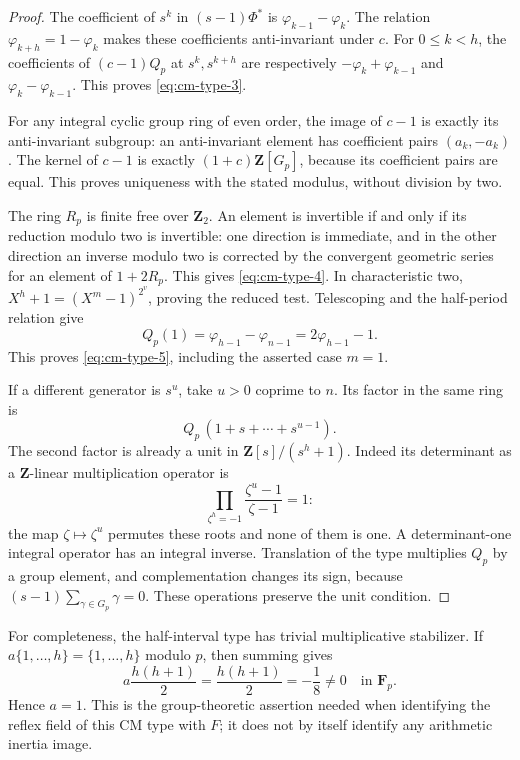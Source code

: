 \begin{proof}
The coefficient of \(s^k\) in \((s-1)\Phi^*\) is
\(\varphi_{k-1}-\varphi_k\). The relation
\(\varphi_{k+h}=1-\varphi_k\) makes these coefficients
anti-invariant under \(c\). For \(0\leq k<h\), the coefficients
of \((c-1)Q_p\) at \(s^k,s^{k+h}\) are respectively
\(-\varphi_k+\varphi_{k-1}\) and
\(\varphi_k-\varphi_{k-1}\). This proves \eqref{eq:cm-type-3}.

For any integral cyclic group ring of even order, the image of
\(c-1\) is exactly its anti-invariant subgroup: an anti-invariant
element has coefficient pairs \((a_k,-a_k)\). The kernel of
\(c-1\) is exactly \((1+c)\mathbf Z[G_p]\), because its
coefficient pairs are equal. This proves uniqueness with the stated
modulus, without division by two.

The ring \(R_p\) is finite free over \(\mathbf Z_2\). An element
is invertible if and only if its reduction modulo two is invertible:
one direction is immediate, and in the other direction an inverse
modulo two is corrected by the convergent geometric series for an
element of \(1+2R_p\). This gives \eqref{eq:cm-type-4}. In characteristic two,
\(X^h+1=(X^m-1)^{2^v}\), proving the reduced test.
Telescoping and the half-period relation give
\[
 Q_p(1)=\varphi_{h-1}-\varphi_{n-1}
                    =2\varphi_{h-1}-1.
\]
This proves \eqref{eq:cm-type-5}, including the asserted case \(m=1\).

If a different generator is \(s^u\), take \(u>0\) coprime to
\(n\). Its factor in the same ring is
\[
       Q_p\,(1+s+\cdots+s^{u-1}).
\]
The second factor is already a unit in
\(\mathbf Z[s]/(s^h+1)\). Indeed its determinant as a
\(\mathbf Z\)-linear multiplication operator is
\[
 \prod_{\zeta^h=-1}\frac{\zeta^u-1}{\zeta-1}=1:
\]
the map \(\zeta\mapsto\zeta^u\) permutes these roots and none
of them is one. A determinant-one integral operator has an integral
inverse. Translation of the type multiplies \(Q_p\) by a group
element, and complementation changes its sign, because
\((s-1)\sum_{\gamma\in G_p}\gamma=0\). These operations preserve
the unit condition.
\end{proof}

For completeness, the half-interval type has trivial multiplicative
stabilizer. If \(a\{1,\ldots,h\}=\{1,\ldots,h\}\) modulo \(p\),
then summing gives
\[
 a\frac{h(h+1)}2=\frac{h(h+1)}2=-\frac18\neq0
                              \quad\text{in }\mathbf F_p.
\]
Hence \(a=1\). This is the group-theoretic assertion needed when
identifying the reflex field of this CM type with \(F\); it does
not by itself identify any arithmetic inertia image.

